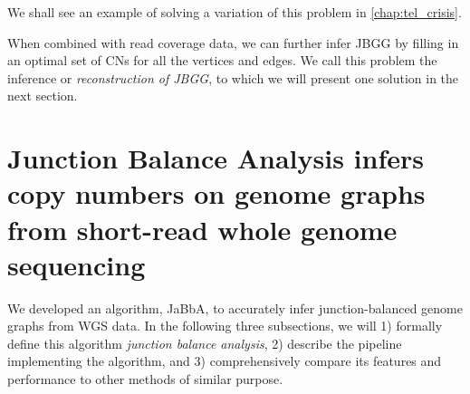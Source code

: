 \documentclass[phd,tocprelim]{cornell}
\begin{document}
We shall see an example of solving a variation of this problem in \ref{chap:tel_crisis}.

When combined with read coverage data, we can further infer JBGG by filling in an optimal set of CNs for all the vertices and edges. We call this problem the inference or \textit{reconstruction of JBGG}, to which we will present one solution in the next section.



\section{Junction Balance Analysis infers copy numbers on genome graphs from short-read whole genome sequencing}

We developed an algorithm, JaBbA, to accurately infer junction-balanced genome graphs from WGS data. In the following three subsections, we will 1) formally define this algorithm \textit{junction balance analysis}, 2) describe the pipeline implementing the algorithm, and 3) comprehensively compare its features and performance to other methods of similar purpose.

\end{document}
